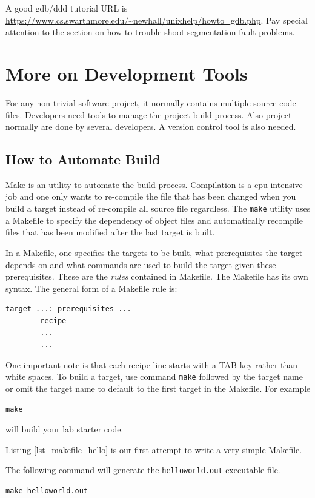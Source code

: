 A good gdb/ddd tutorial URL is \url{https://www.cs.swarthmore.edu/~newhall/unixhelp/howto_gdb.php}. Pay special attention to the section on how to trouble shoot segmentation fault problems.
\section{More on Development Tools}

For any non-trivial software project, it normally contains multiple source code files. Developers need tools to manage the project build process. Also project normally are done by several developers. A version control tool is also needed.

\subsection{How to Automate Build}

Make is an utility to automate the build process. Compilation is a cpu-intensive job and one only wants to re-compile the file that has been changed when you build a target instead of re-compile all source file regardless. 
The \verb+make+ utility uses a Makefile to specify the dependency of object files and automatically recompile files that has been modified after the last target is built. 

In a Makefile, one specifies the targets to be built, what prerequisites the target depends on and what commands are used to build the target given these prerequisites. These are the {\em rules} contained in Makefile. The Makefile has its own syntax.
The general form of a Makefile rule is:
\begin{lstlisting}[style=makefile]
target ...: prerequisites ... 
        recipe
        ...	
        ...	
\end{lstlisting}
One important note is that each recipe line starts with a TAB key rather than white spaces. To build a target, use command \verb+make+ followed by the target name or omit the target name to default to the first target in the Makefile. For example
\begin{lstlisting}[style=bash]
make
\end{lstlisting}
will build your lab starter code.

Listing \ref{lst_makefile_hello} is our first attempt to write a very simple Makefile.


The following command will generate the \verb+helloworld.out+ executable file.
\begin{lstlisting}[style=bash]
make helloworld.out
\end{lstlisting}

